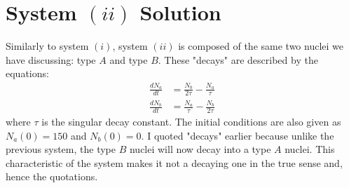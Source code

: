 \documentclass[twocolumn]{article}
\begin{document}
\section{System $(ii)$ Solution}
\hspace{\parindent} Similarly to system $(i)$, system $(ii)$ is composed of the same two nuclei we have discussing: type $A$ and type $B$. These "decays" are described by the equations:
	\begin{align}
	\frac{dN_a}{dt}&=\frac{N_b}{2\tau}-\frac{N_a}{\tau}\\
	\frac{dN_b}{dt}&=\frac{N_a}{\tau}-\frac{N_b}{2\tau}
	\end{align}
where $\tau$ is the singular decay constant. The initial conditions are also given as $N_a(0)=150$ and $N_b(0)=0$. I quoted "decays" earlier because unlike the previous system, the type $B$ nuclei will now decay into a type $A$ nuclei. This characteristic of the system makes it not a decaying one in the true sense and, hence the quotations. 
\end{document}

